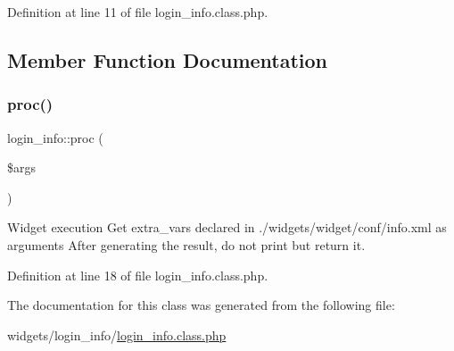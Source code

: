 Definition at line 11 of file login\+\_\+info.\+class.\+php.



\subsection{Member Function Documentation}
\hypertarget{classlogin__info_aae51e17272d714226674208d3bdbf18c}{}\label{classlogin__info_aae51e17272d714226674208d3bdbf18c} 
\subsubsection{\texorpdfstring{proc()}{proc()}}
{\footnotesize\ttfamily login\+\_\+info\+::proc (\begin{DoxyParamCaption}\item[{}]{\$args }\end{DoxyParamCaption})}



Widget execution Get extra\+\_\+vars declared in ./widgets/widget/conf/info.xml as arguments After generating the result, do not print but return it. 



Definition at line 18 of file login\+\_\+info.\+class.\+php.



The documentation for this class was generated from the following file\+:\begin{DoxyCompactItemize}
\item 
widgets/login\+\_\+info/\hyperlink{login__info_8class_8php}{login\+\_\+info.\+class.\+php}\end{DoxyCompactItemize}
